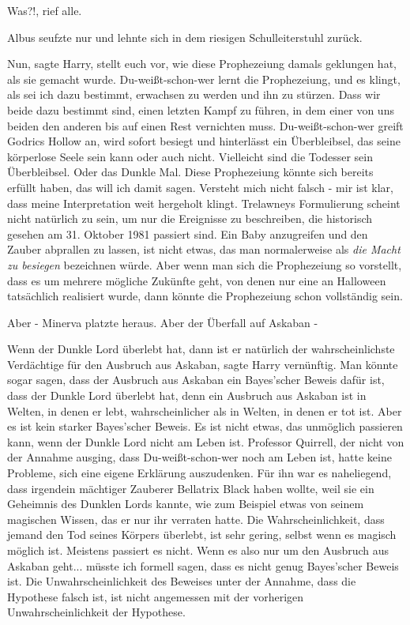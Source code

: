 \glqq{}Was?!\grqq{}, rief alle.

Albus seufzte nur und lehnte sich in dem riesigen Schulleiterstuhl zurück.

\glqq{}Nun\grqq{}, sagte Harry, \glqq{}stellt euch vor, wie diese Prophezeiung
damals geklungen hat, als sie gemacht wurde. Du-weißt-schon-wer lernt die
Prophezeiung, und es klingt, als sei ich dazu bestimmt, erwachsen zu werden und
ihn zu stürzen. Dass wir beide dazu bestimmt sind, einen letzten Kampf zu
führen, in dem einer von uns beiden den anderen bis auf einen Rest vernichten
muss. Du-weißt-schon-wer greift Godrics Hollow an, wird sofort besiegt und
hinterlässt ein Überbleibsel, das seine körperlose Seele sein kann oder auch
nicht. Vielleicht sind die Todesser sein Überbleibsel. Oder das Dunkle Mal.
Diese Prophezeiung könnte sich bereits erfüllt haben, das will ich damit sagen.
Versteht mich nicht falsch - mir ist klar, dass meine Interpretation weit
hergeholt klingt. Trelawneys Formulierung scheint nicht natürlich zu sein, um
nur die Ereignisse zu beschreiben, die historisch gesehen am 31. Oktober 1981
passiert sind. Ein Baby anzugreifen und den Zauber abprallen zu lassen, ist
nicht etwas, das man normalerweise als \emph{\glqq{}die Macht zu besiegen}\grqq{}
bezeichnen würde. Aber wenn man sich die Prophezeiung so vorstellt, dass es um
mehrere mögliche Zukünfte geht, von denen nur eine an Halloween tatsächlich
realisiert wurde, dann könnte die Prophezeiung schon vollständig sein.\grqq{}

\glqq{}Aber -\grqq{} Minerva platzte heraus. \glqq{}Aber der Überfall auf Askaban
-\grqq{}

\glqq{}Wenn der Dunkle Lord überlebt hat, dann ist er natürlich der
wahrscheinlichste Verdächtige für den Ausbruch aus Askaban\grqq{}, sagte Harry
vernünftig. \glqq{}Man könnte sogar sagen, dass der Ausbruch aus Askaban ein
Bayes'scher Beweis dafür ist, dass der Dunkle Lord überlebt hat, denn ein
Ausbruch aus Askaban ist in Welten, in denen er lebt, wahrscheinlicher als in
Welten, in denen er tot ist. Aber es ist kein starker Bayes'scher Beweis. Es ist
nicht etwas, das unmöglich passieren kann, wenn der Dunkle Lord nicht am Leben
ist. Professor Quirrell, der nicht von der Annahme ausging, dass
Du-weißt-schon-wer noch am Leben ist, hatte keine Probleme, sich eine eigene
Erklärung auszudenken. Für ihn war es naheliegend, dass irgendein mächtiger
Zauberer Bellatrix Black haben wollte, weil sie ein Geheimnis des Dunklen Lords
kannte, wie zum Beispiel etwas von seinem magischen Wissen, das er nur ihr
verraten hatte. Die Wahrscheinlichkeit, dass jemand den Tod seines Körpers
überlebt, ist sehr gering, selbst wenn es magisch möglich ist. Meistens passiert
es nicht. Wenn es also nur um den Ausbruch aus Askaban geht... müsste ich
formell sagen, dass es nicht genug Bayes'scher Beweis ist. Die
Unwahrscheinlichkeit des Beweises unter der Annahme, dass die Hypothese falsch
ist, ist nicht angemessen mit der vorherigen Unwahrscheinlichkeit der
Hypothese.\grqq{}

